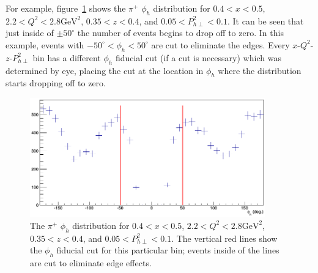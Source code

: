 For example, figure~\ref{fig:rec_pip_phih_x3_QQ0_z7_PT21} shows the $\pi^+$ $\phi_h$ distribution for $0.4 < x < 0.5$, $2.2 < Q^2 < 2.8 \text{GeV}^2$, $0.35 < z < 0.4$, and $0.05 < P_{h\perp}^2 < 0.1$.
It can be seen that just inside of $\pm 50^\circ$ the number of events begins to drop off to zero.
In this example, events with $-50^\circ < \phi_h < 50^\circ$ are cut to eliminate the edges.
Every $x$-$Q^2$-$z$-$P_{h\perp}^2$ bin has a different $\phi_h$ fiducial cut (if a cut is necessary) which was determined by eye, placing the cut at the location in $\phi_h$ where the distribution starts dropping off to zero.
%
\begin{figure}[htp]
\centering
\includegraphics[width=4in]{figures/rec_pip_phih_x3_QQ0_z7_PT21.png}
\caption{The $\pi^+$ $\phi_h$ distribution for $0.4 < x < 0.5$, $2.2 < Q^2 < 2.8 \text{GeV}^2$, $0.35 < z < 0.4$, and $0.05 < P_{h\perp}^2 < 0.1$. The vertical red lines show the $\phi_h$ fiducial cut for this particular bin; events inside of the lines are cut to eliminate edge effects.}
\label{fig:rec_pip_phih_x3_QQ0_z7_PT21}
\end{figure}
%

